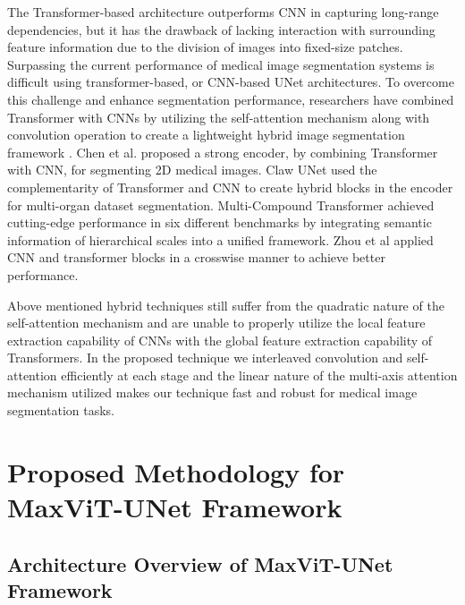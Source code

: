 \documentclass{article}
\begin{document}
The Transformer-based architecture outperforms CNN in capturing long-range dependencies, but it has the drawback of lacking interaction with surrounding feature information due to the division of images into fixed-size patches. Surpassing the current performance of medical image segmentation systems is difficult using transformer-based, or CNN-based UNet architectures. To overcome this challenge and enhance segmentation performance, researchers have combined Transformer with CNNs by utilizing the self-attention mechanism along with convolution operation to create a lightweight hybrid image segmentation framework \cite{zhang2021transfuse,li2023attransunet,guo2022cmt,li2022next}. Chen et al. \cite{chen2021transunet} proposed a strong encoder, by combining Transformer with CNN, for segmenting 2D medical images. Claw UNet \cite{yao2022transclaw} used the complementarity of Transformer and CNN to create hybrid blocks in the encoder for multi-organ dataset segmentation. Multi-Compound Transformer \cite{ji2021multi} achieved cutting-edge performance in six different benchmarks by integrating semantic information of hierarchical scales into a unified framework. Zhou et al \cite{zhou2021nnformer} applied CNN and transformer blocks in a crosswise manner to achieve better performance.

Above mentioned hybrid techniques still suffer from the quadratic nature of the self-attention mechanism and are unable to properly utilize the local feature extraction capability of CNNs with the global feature extraction capability of Transformers. In the proposed technique we interleaved convolution and self-attention efficiently at each stage and the linear nature of the multi-axis attention mechanism utilized makes our technique fast and robust for medical image segmentation tasks.

\section{Proposed Methodology for MaxViT-UNet Framework}\label{Proposed Methodology for MaxViT-UNet Framework}

\subsection{Architecture Overview of MaxViT-UNet Framework}\label{Architecture Overview of MaxViT-UNet Framework}
\end{document}
